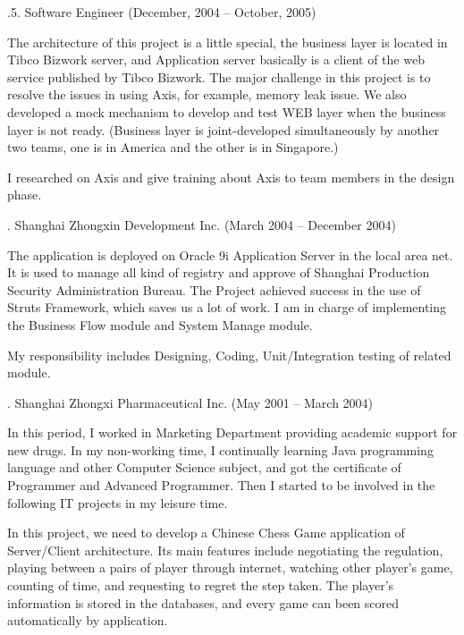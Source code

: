 .5. Software Engineer (December, 2004 -- October, 2005)\par
\noindent
The architecture of this project is a little special, the business layer is located 
in Tibco Bizwork server, and Application server  basically is a client of the 
web service published by Tibco Bizwork. The major challenge in this project 
is to resolve the issues in using Axis, for example, memory leak issue. 
We also developed a mock mechanism to develop and test WEB layer when the
 business layer is not ready. (Business layer is joint-developed simultaneously 
 by another two teams, one is in America and the other is in Singapore.)

I researched on Axis and give training about Axis to team members in the design phase. 

. Shanghai Zhongxin Development Inc. (March 2004 -- December 2004)\par

\noindent
The application is deployed on Oracle 9i Application Server in the local area net. 
It is used to manage all kind of  registry and approve of Shanghai Production 
Security Administration Bureau. The Project achieved success in the use of Struts 
Framework, which saves us a lot of work. I am in charge of implementing the 
Business Flow module and System Manage module. 

My responsibility includes Designing, Coding, Unit/Integration testing of related module. 

. Shanghai Zhongxi Pharmaceutical Inc. (May 2001 -- March 2004)\par

\noindent
In this period, I worked in Marketing Department providing academic support for new drugs. 
In my non-working time, I continually learning Java programming language 
and other Computer Science subject, and got the certificate of Programmer 
and Advanced Programmer. Then I started to be involved in the following 
IT projects in my leisure time.


In this project, we need to develop a Chinese Chess Game application 
of Server/Client architecture. Its main features include negotiating 
the regulation, playing between a pairs of player through internet, 
watching other player's game, counting of time, and requesting to regret
 the step taken. The player's information is stored in the databases,
  and every game can been scored automatically by application. 

